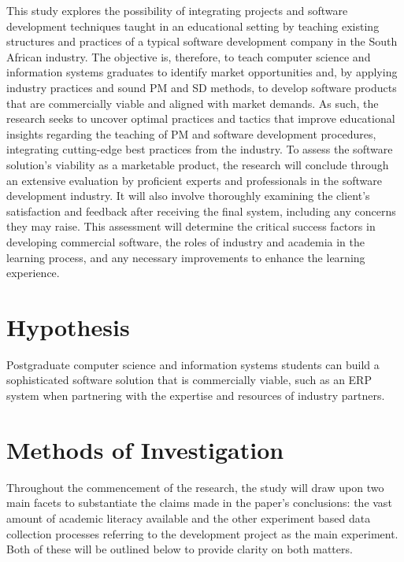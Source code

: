 \par{This study explores the possibility of integrating projects and software development techniques taught in an 
educational setting by teaching existing structures and practices of a typical software development company in the 
South African industry. The objective is, therefore, to teach computer science and information systems graduates to 
identify market opportunities and, by applying industry practices and sound PM and SD methods, to develop software 
products that are commercially viable and aligned with market demands. As such, the research seeks to uncover optimal 
practices and tactics that improve educational insights regarding the teaching of PM and software development procedures, 
integrating cutting-edge best practices from the industry. To assess the software solution's viability as a marketable 
product, the research will conclude through an extensive evaluation by proficient experts and professionals in the software 
development industry. It will also involve thoroughly examining the client's satisfaction and feedback after receiving the 
final system, including any concerns they may raise. This
assessment will determine the critical success factors in developing commercial software, the roles of industry and 
academia in the learning process, and any necessary improvements to enhance the learning experience.}

\section{Hypothesis}
\par{Postgraduate computer science and information systems students can build a sophisticated software solution that is 
commercially viable, such as an ERP system when partnering with the expertise and resources of industry partners.}

\section{Methods of Investigation}
\par{Throughout the commencement of the research, the study will draw upon two main facets to substantiate the claims made in the paper's conclusions: the vast amount of academic literacy available and the other experiment based data collection processes referring to the development project as the main experiment. Both of these will be outlined below to provide clarity on both matters.}
